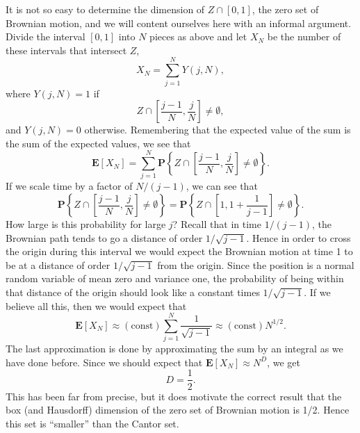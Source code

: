 \documentclass{stml-l}
\theoremstyle{definition}
\numberwithin{equation}{chapter}
\numberwithin{figure}{chapter}
\numberwithin{figure}{section}
\begin{document}
It is not so easy to determine the dimension of $Z\cap[0,1]$, the
zero set of Brownian motion, and we will content ourselves here with
an informal argument. Divide the interval $[0,1]$ into $N$ pieces as
above and let $X_{N}$ be the number of these intervals that
intersect $Z$,
\begin{equation*}
X_{N}=\sum\limits_{j=1}^{N}Y(j,N),
\end{equation*}
where $Y(j,N)=1$ if
\begin{equation*}
Z\cap\left[\frac{j-1}{N},\frac{j}{N}\right]\neq\emptyset,
\end{equation*}
and $Y(j,N)=0$ otherwise. Remembering that the expected value of the
sum is the sum of the expected values, we see that
\begin{equation*}
\mathbf{E}[X_{N}]=\sum\limits_{j=1}^{N}\mathbf{P}\left\{Z\cap\left[\frac{j-1}{N},\frac{j}{N}\right]\neq\emptyset\right\}.
\end{equation*}
If we scale time by a factor of $N/(j-1)$, we can see that
\begin{equation*}
\mathbf{P}\left\{Z\cap\left[\frac{j-1}{N},
\frac{j}{N}\right]\neq\emptyset\right\}=\mathbf{P}\left\{Z\cap\left[1,1+\frac{1}{j-1}\right]\neq\emptyset\right\}.
\end{equation*}
How large is this probability for large $j$? Recall that in time
$1/(j-1)$, the Brownian path tends to go a distance of order
$1/\sqrt{j-1}$. Hence in order to cross the origin during this
interval we would expect the Brownian motion at time 1 to be at a
distance of order $1/\sqrt{j-1}$ from the origin. Since the position
is a normal random variable of mean zero and variance one, the
probability of being within that distance of the origin should look
like a constant times $1/\sqrt{j-1}$. If we believe all this, then
we would expect that
\begin{equation*}
\mathbf{E}[X_{N}]\approx(\mathrm{const}
)\sum\limits_{j=1}^{N}\frac{1}{\sqrt{j-1}}\approx(\mathrm{const})
N^{1/2}.
\end{equation*}
The last approximation is done by approximating the sum by an
integral as we have done before. Since we should expect that
$\mathbf{E}[X_{N}]\approx N^{D}$, we get
\begin{equation*}
D=\frac{1}{2}.
\end{equation*}
This has been far from precise, but it does motivate the correct
result that the box (and Hausdorff) dimension of the zero set of
Brownian motion is 1/2. Hence this set is ``smaller'' than the
Cantor set.
\end{document}
